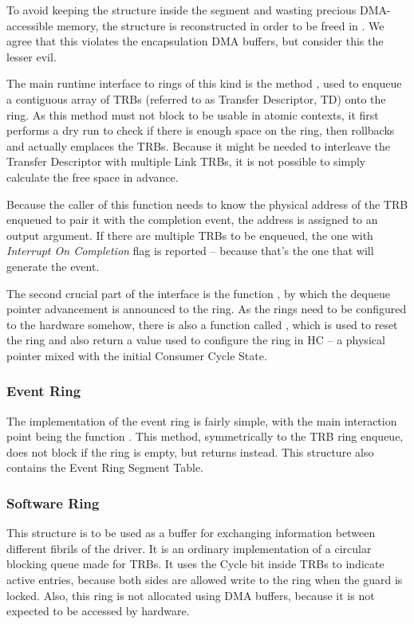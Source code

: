 To avoid keeping the  structure inside the segment and
wasting precious DMA-accessible memory, the structure is reconstructed in order
to be freed in . We agree that this violates the
encapsulation DMA buffers, but consider this the lesser evil.

The main runtime interface to rings of this kind is the method
, used to enqueue a contiguous array of
TRBs (referred to as Transfer Descriptor, TD) onto the ring. As this method
must not block to be usable in atomic contexts, it first performs a dry run to
check if there is enough space on the ring, then rollbacks and actually
emplaces the TRBs. Because it might be needed to interleave the Transfer
Descriptor with multiple Link TRBs, it is not possible to simply calculate the
free space in advance.

Because the caller of this function needs to know the physical address of the
TRB enqueued to pair it with the completion event, the address is assigned to
an output argument. If there are multiple TRBs to be enqueued, the one with
\emph{Interrupt On Completion} flag is reported -- because that's the one that
will generate the event.

The second crucial part of the interface is the function
, by which the dequeue pointer advancement is
announced to the ring. As the rings need to be configured to the hardware
somehow, there is also a function called
, which is used to reset the ring and
also return a value used to configure the ring in HC -- a physical pointer
mixed with the initial Consumer Cycle State.

\subsubsection{Event Ring}

The implementation of the event ring is fairly simple, with the main
interaction point being the function . This
method, symmetrically to the TRB ring enqueue, does not block if the ring is
empty, but returns  instead. This structure also contains the
Event Ring Segment Table.

\subsubsection{Software Ring}

This structure is to be used as a buffer for exchanging information between
different fibrils of the driver. It is an ordinary implementation of a circular
blocking queue made for TRBs. It uses the Cycle bit inside TRBs to indicate
active entries, because both sides are allowed write to the ring when the guard
is locked. Also, this ring is not allocated using DMA buffers, because it is
not expected to be accessed by hardware.
